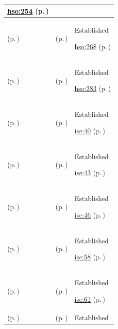 \begin{longtable}{|>{\raggedright\arraybackslash}p{0.27\TableWidth}|>{\raggedright\arraybackslash}p{0.27\TableWidth}|>{\raggedright\arraybackslash}p{0.46\TableWidth}|}
 \hyperref[rad:hso:250]{hso:254} (p.\,\pageref{rad:hso:250})\\\hline
\nameref{service:specimen-transit-tracking-service} (p.\,\pageref{service:specimen-transit-tracking-service}) & \nameref{feature:feat-hso-26} (p.\,\pageref{feature:feat-hso-26}) & Established

 \hyperref[rad:hso:264]{hso:268} (p.\,\pageref{rad:hso:264})\\\hline
\nameref{service:discharge-readiness-telemetry} (p.\,\pageref{service:discharge-readiness-telemetry}) & \nameref{feature:feat-hso-28} (p.\,\pageref{feature:feat-hso-28}) & Established

 \hyperref[rad:hso:275]{hso:283} (p.\,\pageref{rad:hso:275})\\\hline
\nameref{service:longitudinal-clinical-record-query} (p.\,\pageref{service:longitudinal-clinical-record-query}) & \nameref{feature:feat-ise-01} (p.\,\pageref{feature:feat-ise-01}) & Established

 \hyperref[rad:ise:35]{ise:40} (p.\,\pageref{rad:ise:35})\\\hline
\nameref{service:active-problem-allergy-summary-query} (p.\,\pageref{service:active-problem-allergy-summary-query}) & \nameref{feature:feat-ise-02} (p.\,\pageref{feature:feat-ise-02}) & Established

 \hyperref[rad:ise:35]{ise:43} (p.\,\pageref{rad:ise:35})\\\hline
\nameref{service:historical-clinical-record-access} (p.\,\pageref{service:historical-clinical-record-access}) & \nameref{feature:feat-ise-03} (p.\,\pageref{feature:feat-ise-03}) & Established

 \hyperref[rad:ise:35]{ise:46} (p.\,\pageref{rad:ise:35})\\\hline
\nameref{service:hie-submission-gateway-service} (p.\,\pageref{service:hie-submission-gateway-service}) & \nameref{feature:feat-ise-04} (p.\,\pageref{feature:feat-ise-04}) & Established

 \hyperref[rad:ise:52]{ise:58} (p.\,\pageref{rad:ise:52})\\\hline
\nameref{service:federated-health-information-query} (p.\,\pageref{service:federated-health-information-query}) & \nameref{feature:feat-ise-05} (p.\,\pageref{feature:feat-ise-05}) & Established

 \hyperref[rad:ise:52]{ise:61} (p.\,\pageref{rad:ise:52})\\\hline
\nameref{service:addressed-document-delivery-service} (p.\,\pageref{service:addressed-document-delivery-service}) & \nameref{feature:feat-ise-06} (p.\,\pageref{feature:feat-ise-06}) & Established


\end{longtable}
